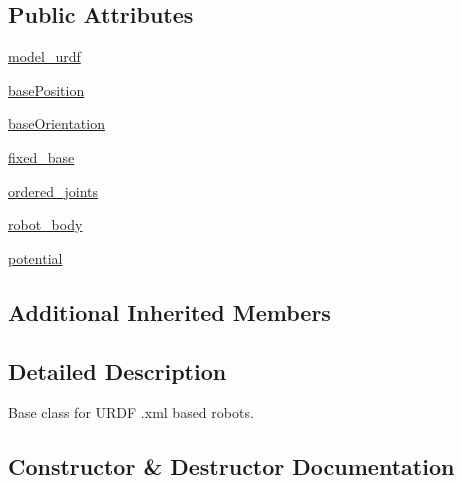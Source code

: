 \subsection*{Public Attributes}
\begin{DoxyCompactItemize}
\item 
\hyperlink{classpybullet-gym_1_1pybulletgym_1_1envs_1_1roboschool_1_1robots_1_1robot__bases_1_1_u_r_d_f_based_robot_a0a5b68545bb8f649088762d74c7af1d9}{model\+\_\+urdf}
\item 
\hyperlink{classpybullet-gym_1_1pybulletgym_1_1envs_1_1roboschool_1_1robots_1_1robot__bases_1_1_u_r_d_f_based_robot_a15f69719168ce7efa995870f562aa81e}{base\+Position}
\item 
\hyperlink{classpybullet-gym_1_1pybulletgym_1_1envs_1_1roboschool_1_1robots_1_1robot__bases_1_1_u_r_d_f_based_robot_ade8d84f5249fc79a1b16607fb73a731d}{base\+Orientation}
\item 
\hyperlink{classpybullet-gym_1_1pybulletgym_1_1envs_1_1roboschool_1_1robots_1_1robot__bases_1_1_u_r_d_f_based_robot_a7e3d2492e0247f2ee35e545d3f2c4da3}{fixed\+\_\+base}
\item 
\hyperlink{classpybullet-gym_1_1pybulletgym_1_1envs_1_1roboschool_1_1robots_1_1robot__bases_1_1_u_r_d_f_based_robot_a92093cdb55133045101194cc38f308e9}{ordered\+\_\+joints}
\item 
\hyperlink{classpybullet-gym_1_1pybulletgym_1_1envs_1_1roboschool_1_1robots_1_1robot__bases_1_1_u_r_d_f_based_robot_a0dd8c02b3be5c043998bafc69d4c1715}{robot\+\_\+body}
\item 
\hyperlink{classpybullet-gym_1_1pybulletgym_1_1envs_1_1roboschool_1_1robots_1_1robot__bases_1_1_u_r_d_f_based_robot_aa062ed4fd268ae75b0dc1cb400e5a37b}{potential}
\end{DoxyCompactItemize}
\subsection*{Additional Inherited Members}


\subsection{Detailed Description}
\begin{DoxyVerb}Base class for URDF .xml based robots.
\end{DoxyVerb}
 

\subsection{Constructor \& Destructor Documentation}
